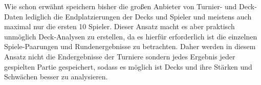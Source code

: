 Wie schon erwähnt speichern bisher die großen Anbieter von Turnier- und Deck-Daten lediglich die Endplatzierungen der Decks und Spieler und meistens auch maximal nur die ersten 10 Spieler. Dieser Ansatz macht es aber praktisch unmöglich Deck-Analysen zu erstellen, da es hierfür erforderlich ist die einzelnen Spiele-Paarungen und Rundenergebnisse zu betrachten. Daher werden in diesem Ansatz nicht die Endergebnisse der Turniere sondern jedes Ergebnis jeder gespielten Partie gespeichert, sodass es möglich ist Decks und ihre Stärken und Schwächen besser zu analysieren.




